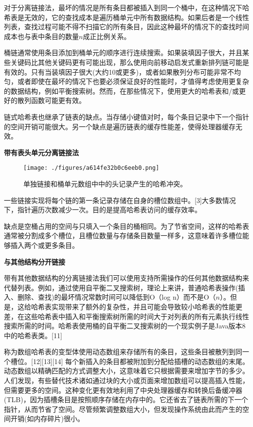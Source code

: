 对于分离链接法，最坏的情况是所有条目都被插入到同一个桶中，在这种情况下哈希表是无效的，它的查找成本是遍历桶单元中所有数据结构。如果后者是一个线性列表，查找过程可能不得不扫描它的所有条目，因此这种最坏的情况下的查找时间成本也与表中条目的数量$n$成正比例关系。

桶链通常使用条目添加到桶单元的顺序进行连续搜索。如果装填因子很大，并且某些关键码比其他关键码更有可能出现，那么使用向前移动启发式重新排列链可能是有效的。只有当装填因子很大(大约10或更多)，或者如果散列分布可能非常不均匀，或者即使在最坏的情况下也要必须保证良好的性能时，才值得考虑使用更复杂的数据结构，例如平衡搜索树。然而，在那些情况下，使用更大的哈希表和/或更好的散列函数可能更有效。

链式哈希表也继承了链表的缺点。当存储小键值对时，每个条目记录中下一个指针的空间开销可能很大。另一个缺点是遍历链表的缓存性能差，使得处理器缓存无效。

\textbf{带有表头单元分离链接法}

\begin{figure}[ht]
\centering
\texttt{[image: ./figures/a614fe32b0c6eeb0.png]}
\caption{单独链接和桶单元数组中中的头记录产生的哈希冲突。} \label{fig_HXB_2}
\end{figure}
一些链接实现将每个链的第一条记录存储在自身的槽位数组中。[3]大多数情况下，指针遍历次数减少一次。目的是提高哈希表访问的缓存效率。

缺点是空桶占用的空间与只填入一个条目的桶相同。为了节省空间，这样的哈希表通常被分割成多个槽位，且槽位数量与存储条目数量一样多，这意味着许多槽位能够插入两个或更多条目。

\textbf{与其他结构分开链接}

带有其他数据结构的分离链接法我们可以使用支持所需操作的任何其他数据结构来代替列表。例如，通过使用自平衡二叉搜索树，理论上来讲，普通哈希表操作(插入、删除、查找)的最坏情况常数时间可以降低到O（log n）而不是O（$n$）。但是，这给哈希表实现带来了额外的复杂性，并且可能会导致较小哈希表的性能更差，在这些哈希表中插入和平衡搜索树所需的时间大于对列表的所有元素执行线性搜索所需的时间。哈希表使用桶的自平衡二叉搜索树的一个现实例子是Java版本8中的哈希表类。[11]

称为数组哈希表的变型体使用动态数组来存储所有的条目，这些条目被散列到同一个槽位。[12][13][14] 每个新插入的条目都被附加到分配给插槽的动态数组的末尾。动态数组以精确匹配的方式调整大小，这意味着它只根据需要来增加字节的多少。人们发现，有些替代技术诸如通过块的大小或页面来增加数组可以提高插入性能，但需要更多的空间。这种变化更有效地利用了中央处理器缓存和转换后备缓冲器(TLB)，因为插槽条目是按照顺序存储在内存中的。它还省去了链表所需的下一个指针，从而节省了空间。尽管频繁调整数组大小，但发现操作系统由此而产生的空间开销(如内存碎片)很小。


